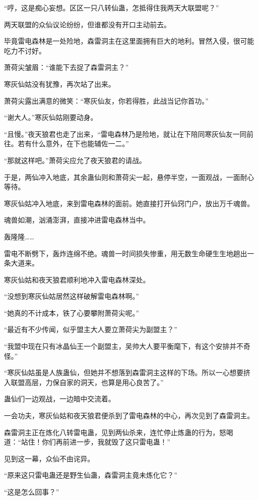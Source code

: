 \begin{this_body}
“哼，这是痴心妄想。区区一只八转仙蛊，怎抵得住我两天大联盟呢？”

两天联盟的众仙议论纷纷，但谁都没有开口主动前去。

毕竟雷电森林是一处险地，森雷洞主在这里面拥有巨大的地利。冒然入侵，很可能吃力不讨好。

萧荷尖皱眉：“谁能下去捉了森雷洞主？”

寒灰仙姑没有犹豫，再次站了出来。

萧荷尖露出满意的微笑：“寒灰仙友，你若得胜，此战当记你首功。”

“谢大人。”寒灰仙姑刚要动身。

“且慢。”夜天狼君也走了出来，“雷电森林乃是险地，就让在下陪同寒灰仙友一同前往。若有什么意外，在下也能辅佐一二。”

“那就这样吧。”萧荷尖应允了夜天狼君的请战。

于是，两仙冲入地底，其余蛊仙则和萧荷尖一起，悬停半空，一面观战，一面耐心等待。

寒灰仙姑冲入地底，来到雷电森林的面前。她直接打开仙窍门户，放出万千魂兽。

魂兽如潮，汹涌澎湃，直接冲进雷电森林当中。

轰隆隆……

雷电不断劈下，轰炸连绵不绝。魂兽一时间损失惨重，用无数生命硬生生地趟出一条大道来。

寒灰仙姑和夜天狼君顺利地冲入雷电森林深处。

“没想到寒灰仙姑居然这样破解雷电森林啊。”

“她真的不计成本，铁了心要攀附萧荷尖呢。”

“最近有不少传闻，似乎盟主大人要立萧荷尖为副盟主？”

“我盟中现在只有冰晶仙王一个副盟主，吴帅大人要平衡麾下，有这个安排并不奇怪。”

“寒灰仙姑虽是人族蛊仙，但她并不想落到森雷洞主这样的下场。所以一心想要挤入联盟高层，力保自家的洞天，也算是用心良苦了。”

蛊仙们一边观战，一边暗中交流着。

一会功夫，寒灰仙姑和夜天狼君便杀到了雷电森林的中心，再次见到了森雷洞主。

森雷洞主正在炼化八转雷电蛊，见到两仙杀来，连忙停止炼蛊的行为，怒喝道：“站住！你们再前进一步，我就毁了这只雷电蛊！”

见到这一幕，众仙不由诧异。

“原来这只雷电蛊还是野生仙蛊，森雷洞主竟未炼化它？”

“这是怎么回事？”


\end{this_body}
